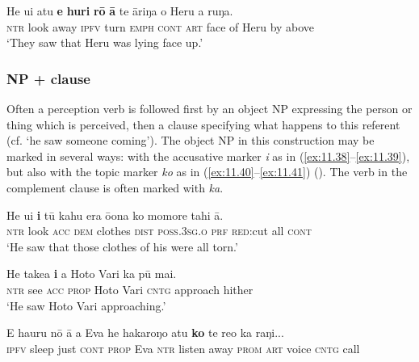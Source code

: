 \ea\label{ex:11.37}
\gll He u{\ꞌ}i atu \textbf{e} \textbf{huri} \textbf{rō} \textbf{{\ꞌ}ā} te {\ꞌ}āriŋa o Heru a ruŋa. \\
\textsc{ntr} look away \textsc{ipfv} turn \textsc{emph} \textsc{cont} \textsc{art} face of Heru by above \\

\glt 
‘They saw that Heru was lying face up.’ \textstyleExampleref{[R313.043]} 
\z
{}
\subsubsection[NP + clause]{NP + clause}\label{sec:11.3.1.2}

Often a perception verb is followed first by an object NP expressing the person or thing which is perceived, then a clause specifying what happens to this referent (cf.  ‘he saw someone coming’). The object NP in this construction may be marked in several ways: with the accusative marker \textit{i} as in (\ref{ex:11.38}–\ref{ex:11.39}), but also with the topic marker \textit{ko} as in (\ref{ex:11.40}–\ref{ex:11.41}) (). The verb in the complement clause is often marked with \textit{ka}.

\ea\label{ex:11.38}
\gll He u{\ꞌ}i \textbf{i} tū kahu era ō{\ꞌ}ona ko momore tahi {\ꞌ}ā.\textup{} \\
\textsc{ntr} look \textsc{acc} \textsc{dem} clothes \textsc{dist} \textsc{poss.3sg.o} \textsc{prf} \textsc{red}:cut all \textsc{cont} \\

\glt 
‘He saw that those clothes of his were all torn.’ \textstyleExampleref{[R250.017]} 
\z

\ea\label{ex:11.39}
\gll He take{\ꞌ}a \textbf{i} a Hoto Vari ka pū mai. \\
\textsc{ntr} see \textsc{acc} \textsc{prop} Hoto Vari \textsc{cntg} approach hither \\

\glt 
‘He saw Hoto Vari approaching.’ \textstyleExampleref{[R304.004]} 
\z

\ea\label{ex:11.40}
\gll E ha{\ꞌ}uru nō {\ꞌ}ā a Eva he hakaroŋo atu \textbf{ko} te re{\ꞌ}o ka raŋi... \\
\textsc{ipfv} sleep just \textsc{cont} \textsc{prop} Eva \textsc{ntr} listen away \textsc{prom} \textsc{art} voice \textsc{cntg} call \\

